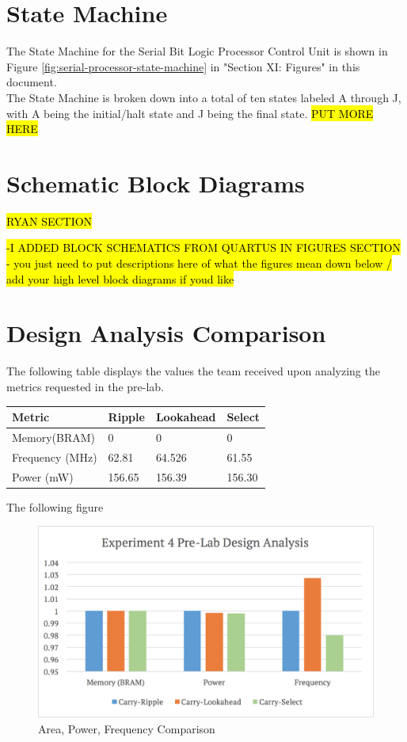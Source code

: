 \documentclass[journal, twocolumn, final,11pt,letterpaper]{IEEEtran}
\begin{document}
\section{State Machine}
The State Machine for the Serial Bit Logic Processor Control Unit is shown in Figure  \ref{fig:serial-processor-state-machine} in "Section XI: Figures" in this document. \\

The State Machine is broken down into a total of ten states labeled A through J, with A being the initial/halt state and J being the final state. \hl{PUT MORE HERE}
	
\section{Schematic Block Diagrams}
\hl{RYAN SECTION}

\hl{-I ADDED BLOCK SCHEMATICS FROM QUARTUS IN FIGURES SECTION -  you just need to put descriptions here of what the figures mean down below / add your high level block diagrams if youd like}

\section{Design Analysis Comparison}
The following table displays the values the team received upon analyzing the metrics requested in the pre-lab.
\begin{center}
	\begin{tabular}{l|lll}
		Metric & Ripple & Lookahead & Select \\ \hline
		Memory(BRAM) & 0 & 0 & 0 \\
		Frequency (MHz) & 62.81 & 64.526 & 61.55\\
		Power (mW) & 156.65 & 156.39 & 156.30\\
	\end{tabular}
\end{center}

The following figure 

\begin{figure} [H]
	\centering
	\includegraphics[scale=0.35]{pre-lab-design-analysis.png}
	\caption{Area, Power, Frequency Comparison\label{fig:pre-lab-design-analysis}}
\end{figure}
\end{document}
